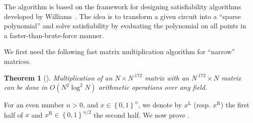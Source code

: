 \documentclass[10pt,a4paper]{article}
\newtheorem{theorem}{Theorem}
\newcommand{\bool}{\left\{0,1\right\}}
\newcommand{\LH}[1]{#1^{\mathrm{L}}}
\newcommand{\RH}[1]{#1^{\mathrm{R}}}
\begin{document}
	The algorithm is based on the framework for designing satisfiability algorithms developed by Williams~\cite{Wil14}. The idea is to transform a given circuit into a ``sparse polynomial'' and solve satisfiability by evaluating the polynomial on all points in a faster-than-brute-force manner.
	
	We first need the following fast matrix multiplication algorithm for ``narrow'' matrices.
	
	\begin{theorem}[\cite{Cop82}]\label{thm:sat-fast-matrix-mul}
		Multiplication of an $N\times N^{.172}$ matrix with an $N^{.172}\times N$ matrix can be done in $O(N^2 \log^2 N)$ arithmetic operations over any field.
	\end{theorem}

	For an even number $n>0$, and $x\in\bool^{n}$, we denote by $\LH{x}$ (resp. $\RH{x}$) the first half of $x$ and $\RH{x}\in\bool^{n/2}$ the second half. We now prove .
	
\end{document}
